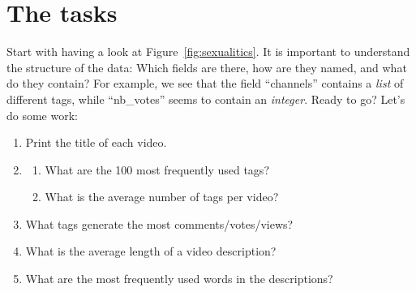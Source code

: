 \documentclass[a4paper,12pt]{book}
\begin{document}
\section{The tasks}
Start with having a look at Figure~\ref{fig:sexualitics}. It is important to understand the structure of the data: Which fields are there, how are they named, and what do they contain? For example, we see that the field ``channels'' contains a \emph{list} of different tags, while ``nb\_votes'' seems to contain an \emph{integer}.
Ready to go? Let's do some work:

\begin{enumerate}
\item Print the title of each video.
\item
	\begin{enumerate} 
	 \item What are the 100 most frequently used tags?
	 \item What is the average number of tags per video?
	\end{enumerate}
\item What tags generate the most comments/votes/views?
\item What is the average length of a video description?
\item What are the most frequently used words in the descriptions?
\end{enumerate}




\backmatter



\end{document}
